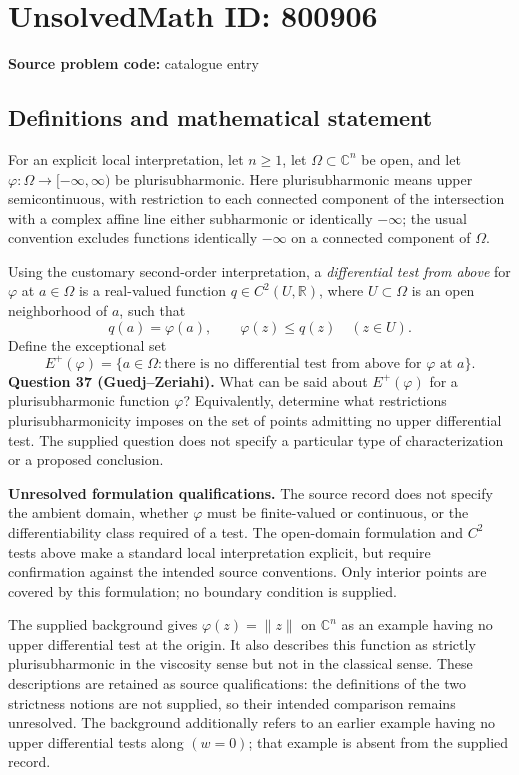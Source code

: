 \documentclass[11pt]{article}
\newcommand{\R}{\mathbb{R}}
\newcommand{\C}{\mathbb{C}}
\begin{document}
\section*{UnsolvedMath ID: 800906}
\textbf{Source problem code:} catalogue entry
\subsection{Definitions and mathematical statement}
For an explicit local interpretation, let \(n\geq 1\), let \(\Omega\subset\C^n\) be open, and let \(\varphi\colon\Omega\to[-\infty,\infty)\) be plurisubharmonic. Here plurisubharmonic means upper semicontinuous, with restriction to each connected component of the intersection with a complex affine line either subharmonic or identically \(-\infty\); the usual convention excludes functions identically \(-\infty\) on a connected component of \(\Omega\).

Using the customary second-order interpretation, a \emph{differential test from above} for \(\varphi\) at \(a\in\Omega\) is a real-valued function \(q\in C^2(U,\R)\), where \(U\subset\Omega\) is an open neighborhood of \(a\), such that
\[
q(a)=\varphi(a),\qquad \varphi(z)\leq q(z)\quad(z\in U).
\]
Define the exceptional set
\[
E^+(\varphi)=\{a\in\Omega:\text{there is no differential test from above for }\varphi\text{ at }a\}.
\]
\textbf{Question 37 (Guedj--Zeriahi).} What can be said about \(E^+(\varphi)\) for a plurisubharmonic function \(\varphi\)? Equivalently, determine what restrictions plurisubharmonicity imposes on the set of points admitting no upper differential test. The supplied question does not specify a particular type of characterization or a proposed conclusion.

\textbf{Unresolved formulation qualifications.} The source record does not specify the ambient domain, whether \(\varphi\) must be finite-valued or continuous, or the differentiability class required of a test. The open-domain formulation and \(C^2\) tests above make a standard local interpretation explicit, but require confirmation against the intended source conventions. Only interior points are covered by this formulation; no boundary condition is supplied.

The supplied background gives \(\varphi(z)=\lVert z\rVert\) on \(\C^n\) as an example having no upper differential test at the origin. It also describes this function as strictly plurisubharmonic in the viscosity sense but not in the classical sense. These descriptions are retained as source qualifications: the definitions of the two strictness notions are not supplied, so their intended comparison remains unresolved. The background additionally refers to an earlier example having no upper differential tests along \((w=0)\); that example is absent from the supplied record.
\end{document}
